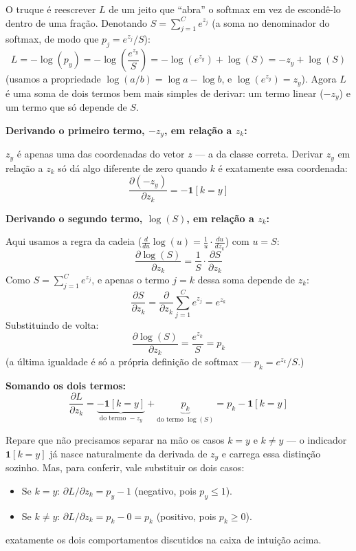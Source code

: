 \documentclass[11pt]{article}
\begin{document}
\begin{curiosos}
O truque é reescrever $L$ de um jeito que ``abra'' o softmax em vez de escondê-lo dentro de uma fração. Denotando $S = \sum_{j=1}^{C} e^{z_j}$ (a soma no denominador do softmax, de modo que $p_j = e^{z_j}/S$):
$$
L = -\log(p_y) = -\log\!\left(\frac{e^{z_y}}{S}\right) = -\log(e^{z_y}) + \log(S) = -z_y + \log(S)
$$
(usamos a propriedade $\log(a/b) = \log a - \log b$, e $\log(e^{z_y}) = z_y$). Agora $L$ é uma soma de dois termos bem mais simples de derivar: um termo linear ($-z_y$) e um termo que só depende de $S$.

\textbf{Derivando o primeiro termo, $-z_y$, em relação a $z_k$:}

$z_y$ é apenas uma das coordenadas do vetor $z$ --- a da classe correta. Derivar $z_y$ em relação a $z_k$ só dá algo diferente de zero quando $k$ é exatamente essa coordenada:
$$
\frac{\partial(-z_y)}{\partial z_k} = -\mathbf{1}[k=y]
$$

\textbf{Derivando o segundo termo, $\log(S)$, em relação a $z_k$:}

Aqui usamos a regra da cadeia ($\frac{d}{du}\log(u) = \frac{1}{u}\cdot\frac{du}{dz_k}$) com $u=S$:
$$
\frac{\partial \log(S)}{\partial z_k} = \frac{1}{S}\cdot\frac{\partial S}{\partial z_k}
$$
Como $S = \sum_{j=1}^{C} e^{z_j}$, e apenas o termo $j=k$ dessa soma depende de $z_k$:
$$
\frac{\partial S}{\partial z_k} = \frac{\partial}{\partial z_k}\sum_{j=1}^{C} e^{z_j} = e^{z_k}
$$
Substituindo de volta:
$$
\frac{\partial \log(S)}{\partial z_k} = \frac{e^{z_k}}{S} = p_k
$$
(a última igualdade é só a própria definição de softmax --- $p_k = e^{z_k}/S$.)

\textbf{Somando os dois termos:}
$$
\frac{\partial L}{\partial z_k} = \underbrace{-\mathbf{1}[k=y]}_{\text{do termo } -z_y} + \underbrace{p_k}_{\text{do termo } \log(S)} = p_k - \mathbf{1}[k=y]
$$

Repare que não precisamos separar na mão os casos $k=y$ e $k\neq y$ --- o indicador $\mathbf{1}[k=y]$ já nasce naturalmente da derivada de $z_y$ e carrega essa distinção sozinho. Mas, para conferir, vale substituir os dois casos:
\begin{itemize}[leftmargin=1.3cm]
  \item Se $k=y$: $\partial L/\partial z_k = p_y - 1$ (negativo, pois $p_y \le 1$).
  \item Se $k\neq y$: $\partial L/\partial z_k = p_k - 0 = p_k$ (positivo, pois $p_k \ge 0$).
\end{itemize}
exatamente os dois comportamentos discutidos na caixa de intuição acima.
\end{curiosos}
\end{document}
